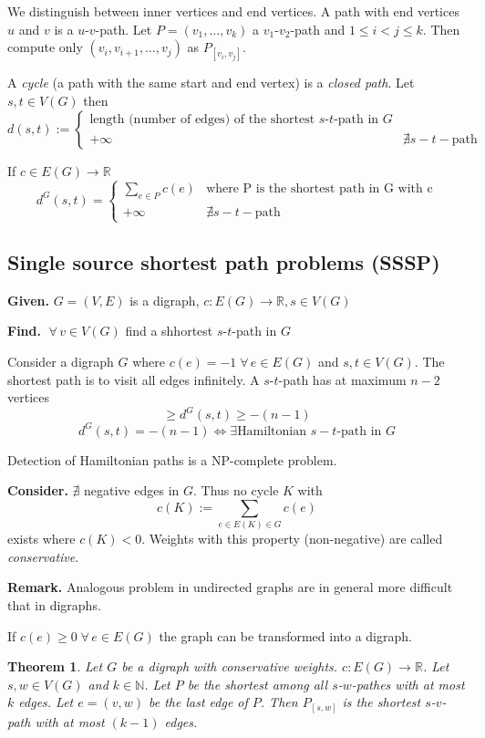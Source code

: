 \documentclass{article}
\newtheorem{theorem}{Theorem}
\newcommand{\given}[1]{\textbf{Given.} #1\par}
\newcommand{\find}[1]{\textbf{Find.} #1\par}
\newcommand{\gath}[2]{$#1$-$#2$-path} %
\newcommand{\fall}{\;\forall\,}
\begin{document}
We distinguish between inner vertices and end vertices. A path with end vertices $u$ and $v$ is a \gath uv. Let $P = (v_1, \ldots, v_k)$ a \gath{v_1}{v_2} and $1 \leq i < j \leq k$. Then compute only $(v_i, v_{i+1}, \ldots, v_j)$ as $P_{[v_i, v_j]}$.

A \emph{cycle} (a path with the same start and end vertex) is a \emph{closed path}. Let $s, t \in V(G)$ then
\[
  d(s, t) := \left\{\begin{array}{lc}
    \text{length (number of edges) of the shortest \gath st in $G$} & \\
    +\infty & \nexists s-t-\text{path}
  \end{array}\right.
\]

If $c \in E(G) \rightarrow \mathbb{R}$
\[
    d^G(s, t) = \left\{\begin{array}{lc}
      \sum_{e \in P} c(e) & \text{where P is the shortest path in G with c} \\
      +\infty & \nexists s-t-\text{path}
    \end{array}\right.
\]

\subsection{Single source shortest path problems (SSSP)}
%
\given{$G=(V,E)$ is a digraph, $c: E(G) \rightarrow \mathbb{R}, s \in V(G)$}
\find{$\fall v \in V(G)$ find a shhortest \gath st in $G$}

Consider a digraph $G$ where $c(e) = -1 \fall e \in E(G)$ and $s,t \in V(G)$. The shortest path is to visit all edges infinitely. A \gath st has at maximum $n-2$ vertices
\[
    \geq d^G(s, t) \geq -(n - 1)
\] \[
    d^G(s, t) = -(n - 1) \Leftrightarrow \exists \text{Hamiltonian $s-t$-path in $G$}
\]

Detection of Hamiltonian paths is a NP-complete problem.

\textbf{Consider.} $\nexists$ negative edges in $G$. Thus no cycle $K$ with
\[
    c(K) := \sum_{e \in E(K) \in G} c(e)
\]
exists where $c(K) < 0$. Weights with this property (non-negative) are called \emph{conservative}.

\textbf{Remark.}
  Analogous problem in undirected graphs are in general more difficult that in digraphs.

If $c(e) \geq 0 \fall e \in E(G)$ the graph can be transformed into a digraph.

\begin{theorem}\label{proposition-3.1}
Let $G$ be a digraph with conservative weights. $c: E(G) \rightarrow \mathbb{R}$. Let $s, w \in V(G)$ and $k \in \mathbb{N}$. Let $P$ be the shortest among all \gath swes with at most $k$ edges. Let $e = (v, w)$ be the last edge of $P$. Then $P_{[s, w]}$ is the shortest \gath sv with at most $(k-1)$ edges.
\end{theorem}
\end{document}
